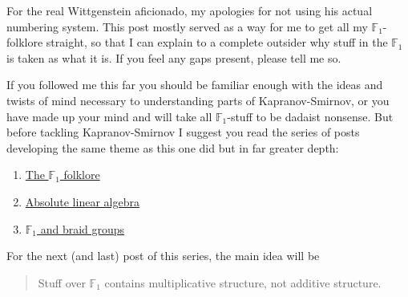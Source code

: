 For the real Wittgenstein aficionado, my apologies for not using his actual numbering system. This post mostly served as a way for me to get all my $\mathbb{F}_1$-folklore straight, so that I can explain to a complete outsider why stuff in the $\mathbb{F}_1$ is taken as what it is. If you feel any gaps present, please tell me so.

If you followed me this far you should be familiar enough with the ideas and twists of mind necessary to understanding parts of Kapranov-Smirnov, or you have made up your mind and will take all $\mathbb{F}_1$-stuff to be dadaist nonsense. But before tackling Kapranov-Smirnov I suggest you read the series of posts developing the same theme as this one did but in far greater depth:
\begin{enumerate}
  \item \href{http://www.neverendingbooks.org/index.php/the-f_un-folklore.html}{The $\mathbb{F}_1$ folklore}
  \item \href{http://www.neverendingbooks.org/index.php/absolute-linear-algebra.html}{Absolute linear algebra}
  \item \href{http://www.neverendingbooks.org/index.php/f_un-and-braid-groups.html}{$\mathbb{F}_1$ and braid groups}
\end{enumerate}

For the next (and last) post of this series, the main idea will be
\begin{quote}
  Stuff over $\mathbb{F}_1$ contains multiplicative structure, not additive structure.
\end{quote}

